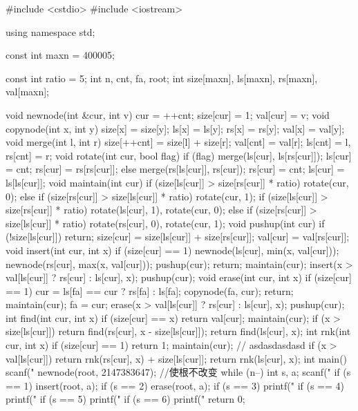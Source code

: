 \begin{cppcode}
#include <cstdio>
#include <iostream>

using namespace std;

const int maxn = 400005;

const int ratio = 5;
int n, cnt, fa, root;
int size[maxn], ls[maxn], rs[maxn], val[maxn];

void newnode(int &cur, int v) {
  cur = ++cnt;
  size[cur] = 1;
  val[cur] = v;
}
void copynode(int x, int y) {
  size[x] = size[y];
  ls[x] = ls[y];
  rs[x] = rs[y];
  val[x] = val[y];
}
void merge(int l, int r) {
  size[++cnt] = size[l] + size[r];
  val[cnt] = val[r];
  ls[cnt] = l, rs[cnt] = r;
}
void rotate(int cur, bool flag) {
  if (flag) {
    merge(ls[cur], ls[rs[cur]]);
    ls[cur] = cnt;
    rs[cur] = rs[rs[cur]];
  } else {
    merge(rs[ls[cur]], rs[cur]);
    rs[cur] = cnt;
    ls[cur] = ls[ls[cur]];
  }
}
void maintain(int cur) {
  if (size[ls[cur]] > size[rs[cur]] * ratio)
    rotate(cur, 0);
  else if (size[rs[cur]] > size[ls[cur]] * ratio)
    rotate(cur, 1);
  if (size[ls[cur]] > size[rs[cur]] * ratio)
    rotate(ls[cur], 1), rotate(cur, 0);
  else if (size[rs[cur]] > size[ls[cur]] * ratio)
    rotate(rs[cur], 0), rotate(cur, 1);
}
void pushup(int cur) {
  if (!size[ls[cur]]) return;
  size[cur] = size[ls[cur]] + size[rs[cur]];
  val[cur] = val[rs[cur]];
}
void insert(int cur, int x) {
  if (size[cur] == 1) {
    newnode(ls[cur], min(x, val[cur]));
    newnode(rs[cur], max(x, val[cur]));
    pushup(cur);
    return;
  }
  maintain(cur);
  insert(x > val[ls[cur]] ? rs[cur] : ls[cur], x);
  pushup(cur);
}
void erase(int cur, int x) {
  if (size[cur] == 1) {
    cur = ls[fa] == cur ? rs[fa] : ls[fa];
    copynode(fa, cur);
    return;
  }
  maintain(cur);
  fa = cur;
  erase(x > val[ls[cur]] ? rs[cur] : ls[cur], x);
  pushup(cur);
}
int find(int cur, int x) {
  if (size[cur] == x) return val[cur];
  maintain(cur);
  if (x > size[ls[cur]]) return find(rs[cur], x - size[ls[cur]]);
  return find(ls[cur], x);
}
int rnk(int cur, int x) {
  if (size[cur] == 1) return 1;
  maintain(cur);  // asdasdasdasd
  if (x > val[ls[cur]]) return rnk(rs[cur], x) + size[ls[cur]];
  return rnk(ls[cur], x);
}
int main() {
  scanf("%
  newnode(root, 2147383647);  //使根不改变
  while (n--) {
    int s, a;
    scanf("%
    if (s == 1) insert(root, a);
    if (s == 2) erase(root, a);
    if (s == 3) printf("%
    if (s == 4) printf("%
    if (s == 5) printf("%
    if (s == 6) printf("%
  }
  return 0;
}
\end{cppcode}

